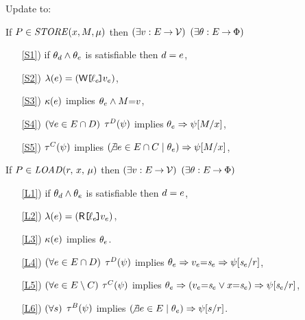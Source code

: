 \begin{definition}[$\xRecycle$/$\xIF$]
  \label{def:pomsets-if}
  Update  to:

  If $\aPS \in \sSTOREtight[\amode]{\aLoc}{\aExp}$ then
  $(\exists v:E\mathbin\rightarrow\mathcal{V})$
  $(\exists\theta:E\mathbin\rightarrow\Phi)$
  \begin{enumerate}
  \item[\ref{S1})] if $\theta_d\land\theta_e$ is satisfiable then $d=e$,
  \item[\ref{S2})] $\labelingAct(\aEv) = \DWREFP{\cVal_\aEv}{\aVal_\aEv}$,
  \item[\ref{S3})] $\kappa(e)$ implies $\theta_e \land M{=}v$,
  \item[\ref{S4})] $(\forall e\in E\cap D)$
    $\aTr{\bEvs}{\bForm}$ implies $\theta_e \Rightarrow \psi[M/x]$,
  \item[\ref{S5})] 
    $\aTr{\cEvs}{\bForm}$ implies $(\!\not\exists e\in E\cap C \mid \theta_e) \Rightarrow \psi[M/x]$,
  \end{enumerate}

  If $\aPS \in \sLOAD[\amode]{\aReg}{\aLoc}$ then
  $(\exists v:E\mathbin\rightarrow\mathcal{V})$
  $(\exists\theta:E\mathbin\rightarrow\Phi)$
  \begin{enumerate}
  \item[\ref{L1})] if $\theta_d\land\theta_e$ is satisfiable then $d=e$,
  \item[\ref{L2})] $\labelingAct(\aEv) = \DRREFP{\cVal_\aEv}{\aVal_\aEv}$,
  \item[\ref{L3})] $\kappa(e)$ implies $\theta_e$.
  \item[\ref{L4})] $(\forall e\in E\cap D)$
    $\aTr{\bEvs}{\bForm}$ implies $\theta_e \Rightarrow v_e{=}\mathit{s}_{e}\Rightarrow\psi[\mathit{s}_{e}/r]$, 
  \item[\ref{L5})] $(\forall e\in E\setminus C)$
    $\aTr{\cEvs}{\bForm}$ implies $\theta_e \Rightarrow (v_e{=}\mathit{s}_{e}\lor x{=}\mathit{s}_{e})\allowbreak\Rightarrow\psi[\mathit{s}_{e}/r]$,
  \item[\ref{L6})] $(\forall s)$
    $\aTr{\dEvs}{\bForm}$ implies $(\!\not\exists e\in E \mid \theta_e) \Rightarrow \psi[s/r]$. 
  \end{enumerate}  
\end{definition}

